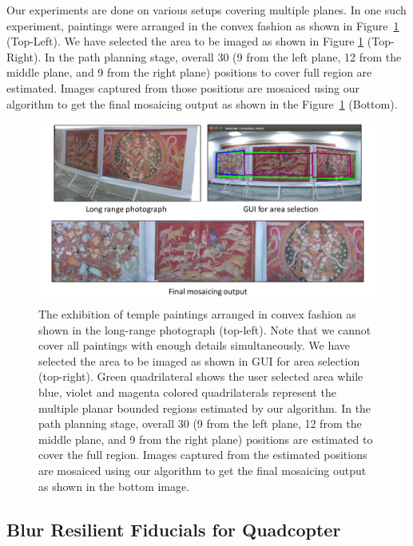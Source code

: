 Our experiments are done on various setups covering multiple planes.
In one such experiment, paintings were arranged in the convex
fashion as shown in Figure~\ref{fig:multiplanar_result} (Top-Left). We have
selected the area to be imaged as shown in Figure \ref{fig:multiplanar_result}
(Top-Right). In the path planning stage, overall 30 (9 from the left plane, 12
from the middle plane, and 9 from the right plane) positions to cover full
region are estimated.  Images captured from those positions are mosaiced using our
algorithm to get the final mosaicing output as shown in the
Figure~\ref{fig:multiplanar_result} (Bottom).
\begin{figure}[h!]
	\centering
	\includegraphics[width=0.98\linewidth]{figures/multiplanar/convexResult}
	\caption[Result: Imaging Convex Surface ]{The exhibition of 
	temple paintings arranged in convex fashion as shown in the long-range
	photograph (top-left). Note that we cannot cover all paintings with enough
	details simultaneously. We have selected the area to be imaged as shown in GUI
	for area selection (top-right). Green quadrilateral shows the user selected
	area while blue, violet and magenta colored quadrilaterals represent the
	multiple planar bounded regions estimated by our algorithm. In the path
	planning stage, overall 30 (9 from the left plane, 12 from the middle plane,
	and 9 from the right plane) positions are estimated to cover the full region.
	Images captured from the estimated positions are mosaiced using our algorithm to get
	the final mosaicing output as shown in the bottom image.}
	\label{fig:multiplanar_result}
\end{figure}
	
\subsection{Blur Resilient Fiducials for Quadcopter}

